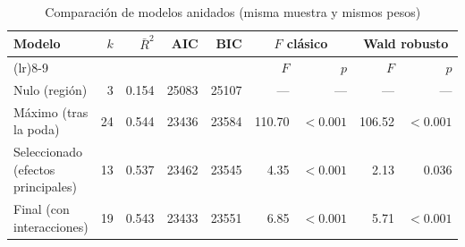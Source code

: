 \begin{table}[htbp]
\centering
\footnotesize\setlength{\tabcolsep}{4pt}
\caption{Comparación de modelos anidados (misma muestra y mismos pesos)}\label{tab:comparacion}
\begin{tabularx}{\linewidth}{>{\raggedright\arraybackslash}X r r r r r r r r}
\toprule
Modelo & $k$ & $\bar R^2$ & AIC & BIC & \multicolumn{2}{c}{$F$ clásico} & \multicolumn{2}{c}{Wald robusto} \\ \cmidrule(lr){6-7}\cmidrule(lr){8-9} & & & & & $F$ & $p$ & $F$ & $p$ \\
\midrule
Nulo (región) & 3 & \num{0.154} & \num{25083} & \num{25107} & --- & --- & --- & --- \\
Máximo (tras la poda) & 24 & \num{0.544} & \num{23436} & \num{23584} & \num{110.70} & $<\num{0.001}$ & \num{106.52} & $<\num{0.001}$ \\
Seleccionado (efectos principales) & 13 & \num{0.537} & \num{23462} & \num{23545} & \num{4.35} & $<\num{0.001}$ & \num{2.13} & \num{0.036} \\
Final (con interacciones) & 19 & \num{0.543} & \num{23433} & \num{23551} & \num{6.85} & $<\num{0.001}$ & \num{5.71} & $<\num{0.001}$ \\
\bottomrule
\end{tabularx}
\par{}
\end{table}
